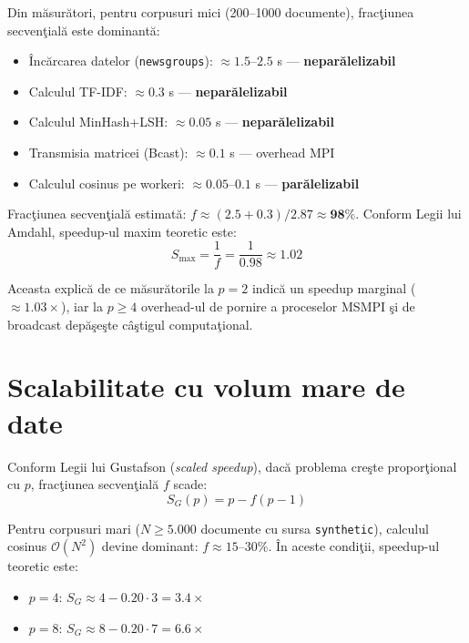 \documentclass[a4paper,12pt]{report}
\begin{document}
Din m\u{a}sur\u{a}tori, pentru corpusuri mici (200–1000 documente), frac\c{t}iunea secven\c{t}ial\u{a} este dominant\u{a}:
\begin{itemize}
  \item \^{I}nc\u{a}rcarea datelor (\texttt{newsgroups}): $\approx 1.5$–$2.5$ s — \textbf{nepar\u{a}lelizabil}
  \item Calculul TF-IDF: $\approx 0.3$ s — \textbf{nepar\u{a}lelizabil}
  \item Calculul MinHash+LSH: $\approx 0.05$ s — \textbf{nepar\u{a}lelizabil}
  \item Transmisia matricei (Bcast): $\approx 0.1$ s — overhead MPI
  \item Calculul cosinus pe workeri: $\approx 0.05$–$0.1$ s — \textbf{par\u{a}lelizabil}
\end{itemize}

Frac\c{t}iunea secven\c{t}ial\u{a} estimat\u{a}: $f \approx (2.5 + 0.3) / 2.87 \approx \mathbf{98\%}$. Conform Legii lui Amdahl, speedup-ul maxim teoretic este:
\begin{equation}
  S_{\max} = \frac{1}{f} = \frac{1}{0.98} \approx 1.02
\label{eq:smax}
\end{equation}

Aceasta explic\u{a} de ce m\u{a}sur\u{a}torile la $p=2$ indic\u{a} un speedup marginal ($\approx 1.03\times$), iar la $p \geq 4$ overhead-ul de pornire a proceselor MSMPI \c{s}i de broadcast dep\u{a}\c{s}e\c{s}te c\^{a}\c{s}tigul computa\c{t}ional.

\section{Scalabilitate cu volum mare de date}

Conform Legii lui Gustafson \cite{gustafson1988} (\textit{scaled speedup}), dac\u{a} problema cre\c{s}te propor\c{t}ional cu $p$, frac\c{t}iunea secven\c{t}ial\u{a} $f$ scade:
\begin{equation}
  S_G(p) = p - f(p-1)
\label{eq:gustafson}
\end{equation}

Pentru corpusuri mari ($N \geq 5.000$ documente cu sursa \texttt{synthetic}), calculul cosinus $\mathcal{O}(N^2)$ devine dominant: $f \approx 15$–$30\%$. \^{I}n aceste condi\c{t}ii, speedup-ul teoretic este:
\begin{itemize}
  \item $p=4$: $S_G \approx 4 - 0.20 \cdot 3 = 3.4\times$
  \item $p=8$: $S_G \approx 8 - 0.20 \cdot 7 = 6.6\times$
\end{itemize}
\end{document}
